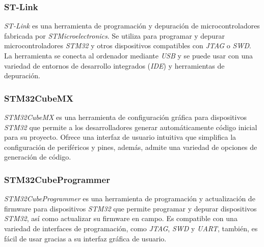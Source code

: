 \subsubsection{ST-Link}

\textit{ST-Link} \citep{st-link} es una herramienta de programación y depuración de microcontroladores fabricada por \textit{STMicroelectronics}. Se utiliza para programar y depurar microcontroladores \textit{STM32} y otros dispositivos compatibles con \textit{JTAG} o \textit{SWD}. La herramienta se conecta al ordenador mediante \textit{USB} y se puede usar con una variedad de entornos de desarrollo integrados (\textit{IDE}) y herramientas de depuración. 


\subsubsection{STM32CubeMX}

\textit{STM32CubeMX} \citep{stm32-cubemx} es una herramienta de configuración gráfica para dispositivos \textit{STM32} que permite a los desarrolladores generar automáticamente código inicial para su proyecto. Ofrece una interfaz de usuario intuitiva que simplifica la configuración de periféricos y pines, además, admite una variedad de opciones de generación de código. 


\subsubsection{STM32CubeProgrammer}

\textit{STM32CubeProgrammer} \citep{stm32-cubeprogrammer} es una herramienta de programación y actualización de firmware para dispositivos \textit{STM32} que permite programar y depurar dispositivos \textit{STM32}, así como actualizar su firmware en campo. Es compatible con una variedad de interfaces de programación, como \textit{JTAG}, \textit{SWD} y \textit{UART}, también, es fácil de usar gracias a su interfaz gráfica de usuario. 



